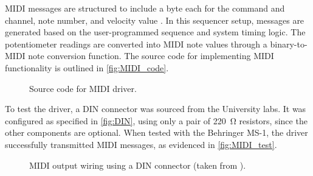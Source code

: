 \documentclass[12pt]{article}
\numberwithin{subsubsubsection}{subsubsection}
\begin{document}
MIDI messages are structured to include a byte each for the command and channel, note number, and velocity value \cite{MIDI_protocol}. In this sequencer setup, messages are generated based on the user-programmed sequence and system timing logic. The potentiometer readings are converted into MIDI note values through a binary-to-MIDI note conversion function. The source code for implementing MIDI functionality is outlined in \autoref{fig:MIDI_code}.

\begin{figure}[H]
    \centering
    \caption{Source code for MIDI driver.}
    \label{fig:MIDI_code}
\end{figure}

To test the driver, a DIN connector was sourced from the University labs. It was configured as specified in \autoref{fig:DIN}, using only a pair of \SI{220}{\ohm} resistors, since the other components are optional. When tested with the Behringer MS-1, the driver successfully transmitted MIDI messages, as evidenced in \autoref{fig:MIDI_test}.

\begin{figure}[H]
    \centering
    \caption{MIDI output wiring using a DIN connector (taken from \cite{MIDI_out}).}
    \label{fig:DIN}
\end{figure}
\end{document}
